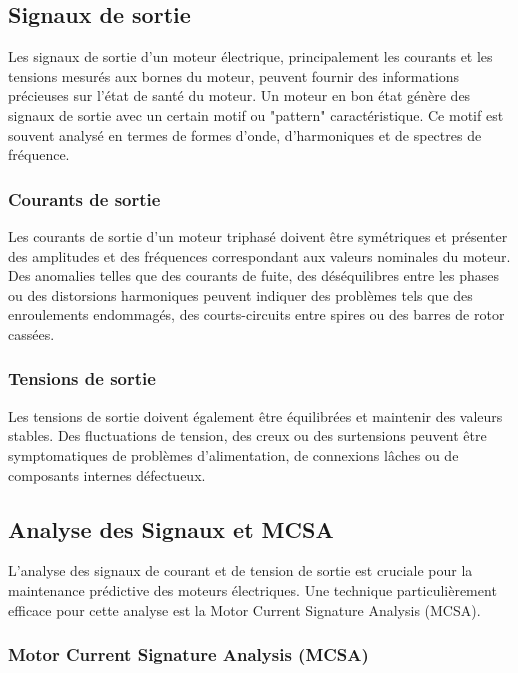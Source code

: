 \subsection*{Signaux de sortie}

Les signaux de sortie d'un moteur électrique, principalement les courants et
les tensions mesurés aux bornes du moteur, peuvent fournir des informations
précieuses sur l'état de santé du moteur. Un moteur en bon état génère des
signaux de sortie avec un certain motif ou "pattern" caractéristique. Ce motif
est souvent analysé en termes de formes d'onde, d'harmoniques et de spectres de
fréquence.

\subsubsection*{Courants de sortie}

Les courants de sortie d'un moteur triphasé doivent être symétriques et
présenter des amplitudes et des fréquences correspondant aux valeurs nominales
du moteur. Des anomalies telles que des courants de fuite, des déséquilibres
entre les phases ou des distorsions harmoniques peuvent indiquer des problèmes
tels que des enroulements endommagés, des courts-circuits entre spires ou des
barres de rotor cassées.

\subsubsection*{Tensions de sortie}

Les tensions de sortie doivent également être équilibrées et maintenir des
valeurs stables. Des fluctuations de tension, des creux ou des surtensions
peuvent être symptomatiques de problèmes d'alimentation, de connexions lâches
ou de composants internes défectueux.

\subsection*{Analyse des Signaux et MCSA}

L'analyse des signaux de courant et de tension de sortie est cruciale pour la
maintenance prédictive des moteurs électriques. Une technique particulièrement
efficace pour cette analyse est la Motor Current Signature Analysis (MCSA).

\subsubsection*{Motor Current Signature Analysis (MCSA)}

